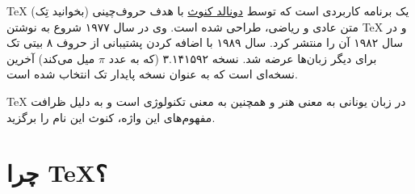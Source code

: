 \documentclass[a4paper,12pt]{report}
\begin{document}
\TeX
(بخوانید تِک) یک برنامه کاربردی است که توسط 
 \href{http://en.wikipedia.org/wiki/Donald_Knuth}{دونالد کنوث}
با هدف حروف‌چینی متن عادی و ریاضی، طراحی شده است. 
وی در سال ۱۹۷۷ شروع به نوشتن 
\TeX
و در سال ۱۹۸۲ آن را منتشر کرد. سال ۱۹۸۹ با اضافه کردن پشتیبانی از حروف ۸ بیتی تک برای دیگر زبان‌ها عرضه شد. نسخه ۳.۱۴۱۵۹۲ (که به عدد $\pi$ میل می‌کند) آخرین نسخه‌ای است که به عنوان نسخه پایدار تک انتخاب شده است.

\TeX
در زبان یونانی به معنی هنر و همچنین به معنی تکنولوژی است و به دلیل ظرافت مفهوم‌های این واژه، کنوث این نام را برگزید.

\section*{چرا \TeX؟}
\end{document}
